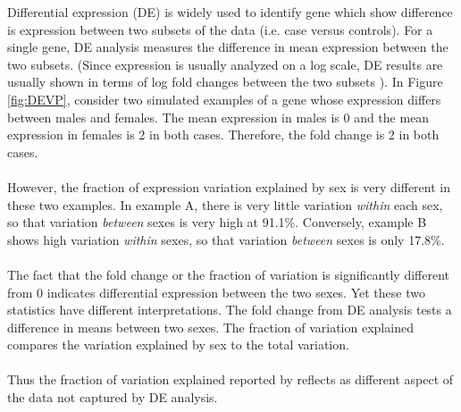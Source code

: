 \documentclass[12pt]{article}\usepackage[]{graphicx}\usepackage[]{xcolor}
\begin{document}
Differential expression (DE) is widely used to identify gene which show difference is expression between two subsets of the data (i.e. case versus controls). For a single gene, DE analysis measures the difference in mean expression between the two subsets.  (Since expression is usually analyzed on a log scale, DE results are usually shown in terms of log fold changes between the two subsets ).  In Figure \ref{fig:DEVP}, consider two simulated examples of a gene whose expression differs between males and females.  The mean expression in males is 0 and the mean expression in females is 2 in both cases.  Therefore, the fold change is 2 in both cases.\\
\\  
However, the fraction of expression variation explained by sex is very different in these two examples.  In example A, there is very little variation {\it within} each sex, so that variation {\it between} sexes is very high at 91.1\%.  Conversely, example B shows high variation {\it within} sexes, so that variation {\it between} sexes is only 17.8\%.\\
\\
The fact that the fold change or the fraction of variation is significantly different from 0 indicates differential expression between the two sexes.  Yet these two statistics have different interpretations.  The fold change from DE analysis tests a difference in means between two sexes.  The fraction of variation explained compares the variation explained by sex to the total variation.\\
\\
Thus the fraction of variation explained reported by  reflects as different aspect of the data not captured by DE analysis.
\end{document}
